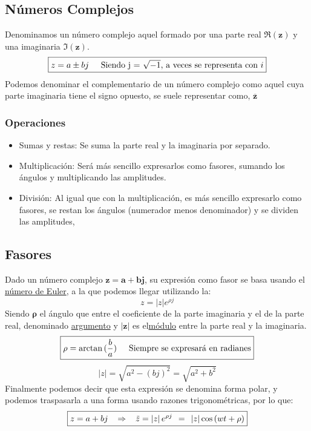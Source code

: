\subsection{Números Complejos}
 Denominamos un número complejo aquel formado por una parte real \(\mathbf{\Re(z)}\) y una imaginaria \(\mathbf{\Im(z)}\).
\[
        \boxed{ z = a\pm bj \hspace{5mm} \textnormal{Siendo j = \(\sqrt{-1}\), a veces se representa con \(i\)}}
\]
Podemos denominar el complementario de un número complejo como aquel cuya parte imaginaria tiene el signo opuesto, se suele representar como, \(\mathbf{\overline{z}}\)
\subsubsection{Operaciones}
\begin{itemize}
        \item Sumas y restas: Se suma la parte real y la imaginaria por separado.
        \item Multiplicación: Será más sencillo expresarlos como fasores, sumando los ángulos y multiplicando las amplitudes.
        \item División: Al igual que con la multiplicación, es más sencillo expresarlo como fasores, se restan los ángulos (numerador menos denominador) y se dividen las amplitudes,
\end{itemize}
\subsection{Fasores}
 Dado un número complejo \(\mathbf{z = a + bj}\), su expresión como fasor se basa usando el \underline{número de Euler}, a la que podemos llegar utilizando la:
\[
        \boxed{z = \left | z \right |e^{\rho j}}
\]
 Siendo \(\mathbf{\rho}\) el ángulo que entre el coeficiente de la parte imaginaria y el de la parte real, denominado \underline{argumento} y \(\mathbf{\left | z \right |}\) es el\underline{módulo} entre la parte real y la imaginaria.
\[\boxed{
                \rho = \arctan{(\frac{b}{a})} \hspace{5mm} \textnormal{Siempre se expresará en radianes}}
\]
\[
        \boxed{\left | z \right |=\sqrt{a^2 - (bj)^2} = \sqrt{a^2+ b^2}}
\]
 Finalmente podemos decir que esta expresión se denomina forma polar, y podemos traspasarla a una forma usando razones trigonométricas, por lo que:
\[
        \boxed{z = a + bj \hspace{3mm} \Rightarrow \hspace{3mm}\tilde{z} = \left | z \right |e^{\rho j} \hspace{1.5mm}=\hspace{1.5mm}\left | z \right | \cos{(wt + \rho)}}
\]